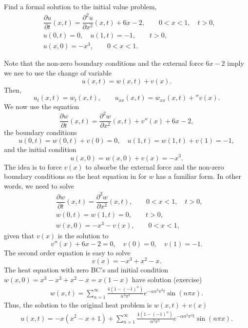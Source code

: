 \documentclass[11pt]{article}
\begin{document}
\begin{problem}
Find a formal solution to the initial value problem,
\begin{equation*} \begin{split}
& \dfrac{\partial u }{\partial t } (x,t) = \dfrac{\partial^2 u}{\partial x^2}(x,t) + 6 x -2, \qquad 0<x<1, \quad t>0, \\
& u(0,t) = 0, \quad u(1,t)= -1, \qquad t>0, \\
& u(x,0) = -x^{3}, \qquad 0<x<1.
\end{split}\end{equation*}
\end{problem}
\begin{solution}
Note that the non-zero boundary conditions and the external force $6x-2$ imply we nee to use the change of variable
\[u(x,t)=w(x,t)+v(x).\]
Then,
\[u_{t}(x,t)=w_{t}(x,t), \qquad u_{xx}(x,t)=w_{xx}(x,t)+''v(x).\]
We now use the equation
\[\dfrac{\partial w }{\partial t } (x,t) = \dfrac{\partial^2 w}{\partial x^2}(x,t) + v''(x) + 6 x -2,\]
the boundary conditions
\[u(0,t) = w(0,t) + v(0) = 0, \quad u(1,t)= w(1,t) + v(1) = -1,\]
and the initial condition
\[u(x,0) = w(x,0) + v(x) = -x^{3}.\]
The idea is to force $v(x)$ to absorbe the external force and the non-zero boundary conditions so the heat equation in for $w$ has a familiar form. In other words, we need to solve
\begin{equation*} \begin{split}
& \dfrac{\partial w }{\partial t } (x,t) = \dfrac{\partial^2 w}{\partial x^2}(x,t), \qquad 0<x<1, \quad t>0, \\
& w(0,t) = w(1,t)= 0, \qquad t>0, \\
& w(x,0) = -x^{3} - v(x), \qquad 0<x<1,
\end{split}\end{equation*}
given that $v(x)$ is the solution to
\begin{equation}
v''(x)+6x-2=0,\quad v(0)=0, \quad v(1)=-1.
\end{equation}
The second order equation is easy to solve
\[v(x)=-x^{3}+x^{2}-x.\]
The heat equation with zero BC's and initial condition $w(x,0)=x^{3}-x^{3}+x^{2}-x=x(1-x)$ have solution (exercise)
\begin{eqnarray*}
w(x,t) = \sum_{n=1}^{\infty}\frac{4(1-(-1)^{n})}{n^{3}\pi^{3}}e^{-\alpha n^{2}\pi^{2}t}\sin (n\pi x).
\end{eqnarray*}
Thus, the solution to the original heat problem is $w(x,t)+v(x)$
\begin{eqnarray*}
\boxed{u(x,t) = -x(x^{2}-x+1)+\sum_{n=1}^{\infty}\frac{4(1-(-1)^{n})}{n^{3}\pi^{3}}e^{-\alpha n^{2}\pi^{2}t}\sin (n\pi x)}.
\end{eqnarray*}
\end{solution}
\end{document}
